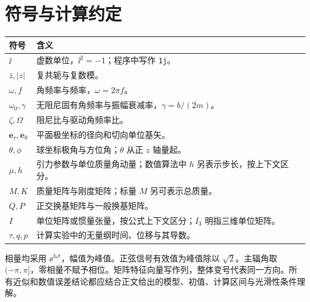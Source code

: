\documentclass[11pt,openany,fontset=fandol]{ctexbook}
\theoremstyle{plain}\newtheorem{theorem}{定理}[chapter]\newtheorem{proposition}[theorem]{命题}
\theoremstyle{definition}\newtheorem{definition}{定义}[chapter]\newtheorem{example}{例}[chapter]
\theoremstyle{remark}\newtheorem*{remark}{说明}
\newcommand{\vct}[1]{\bm{#1}}\newcommand{\Rea}{\operatorname{Re}}\newcommand{\Ima}{\operatorname{Im}}
\begin{document}
\endgroup
\backmatter
\chapter*{符号与计算约定}
\begin{tabularx}{\linewidth}{@{}p{25mm}X@{}}\toprule
符号 & 含义\\\midrule
$\ii$ & 虚数单位，$\ii^2=-1$；程序中写作 \texttt{1j}。\\
$\bar z,|z|$ & 复共轭与复数模。\\
$\omega,f$ & 角频率与频率，$\omega=2\pi f$。\\
$\omega_0,\gamma$ & 无阻尼固有角频率与振幅衰减率，$\gamma=b/(2m)$。\\
$\zeta,\Omega$ & 阻尼比与驱动角频率比。\\
$\vct e_r,\vct e_\theta$ & 平面极坐标的径向和切向单位基矢。\\
$\theta,\phi$ & 球坐标极角与方位角；$\theta$ 从正 $z$ 轴量起。\\
$\mu,h$ & 引力参数与单位质量角动量；数值算法中 $h$ 另表示步长，按上下文区分。\\
$M,K$ & 质量矩阵与刚度矩阵；标量 $M$ 另可表示总质量。\\
$Q,P$ & 正交换基矩阵与一般换基矩阵。\\
$I$ & 单位矩阵或惯量张量，按公式上下文区分；$I_3$ 明指三维单位矩阵。\\
$\tau,q,p$ & 计算实验中的无量纲时间、位移与其导数。\\\bottomrule
\end{tabularx}

相量均采用 $\ee^{\ii\omega t}$，幅值为峰值。正弦信号有效值为峰值除以 $\sqrt2$。主辐角取 $(-\pi,\pi]$，零相量不赋予相位。矩阵特征向量写作列，整体变号代表同一方向。所有近似和数值误差结论都应结合正文给出的模型、初值、计算区间与光滑性条件理解。
\end{document}
